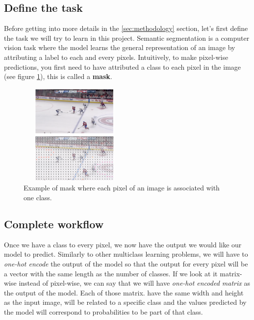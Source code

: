 \subsection{Define the task}
Before getting into more details in the \ref{sec:methodology} section, let's first define the task we will try to learn in this project. Semantic segmentation is a computer vision task where the model learns the general representation of an image by attributing a label to each and every pixels. Intuitively, to make pixel-wise predictions, you first need to have attributed a class to each pixel in the image (see figure \ref{fig:mask}), this is called a \textbf{mask}.

\begin{figure}[H]
	\centering
	\includegraphics[width=5.5cm, height=5cm]{figures/mask-example.png}
	\caption{Example of mask where each pixel of an image is associated with one class.}
	\label{fig:mask}
\end{figure}

\subsection{Complete workflow}
Once we have a class to every pixel, we now have the output we would like our model to predict. Similarly to other multiclass learning problems, we will have to \textit{one-hot encode} the output of the model so that the output for every pixel will be a vector with the same length as the number of classes. If we look at it matrix-wise instead of pixel-wise, we can say that we will have \textit{one-hot encoded matrix} as the output of the model. Each of those matrix. have the same width and height as the input image, will be related to a specific class and the values predicted by the model will correspond to probabilities to be part of that class.

